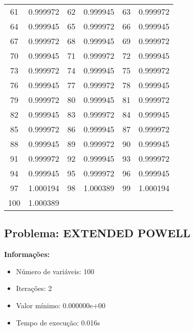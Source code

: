 \documentclass[12pt]{article}
\begin{document}
\begin{longtable}{@{}cc|cc|cc@{}}
61 & 0.999972 & 62 & 0.999945 & 63 & 0.999972 \\
64 & 0.999945 & 65 & 0.999972 & 66 & 0.999945 \\
67 & 0.999972 & 68 & 0.999945 & 69 & 0.999972 \\
70 & 0.999945 & 71 & 0.999972 & 72 & 0.999945 \\
73 & 0.999972 & 74 & 0.999945 & 75 & 0.999972 \\
76 & 0.999945 & 77 & 0.999972 & 78 & 0.999945 \\
79 & 0.999972 & 80 & 0.999945 & 81 & 0.999972 \\
82 & 0.999945 & 83 & 0.999972 & 84 & 0.999945 \\
85 & 0.999972 & 86 & 0.999945 & 87 & 0.999972 \\
88 & 0.999945 & 89 & 0.999972 & 90 & 0.999945 \\
91 & 0.999972 & 92 & 0.999945 & 93 & 0.999972 \\
94 & 0.999945 & 95 & 0.999972 & 96 & 0.999945 \\
97 & 1.000194 & 98 & 1.000389 & 99 & 1.000194 \\
100 & 1.000389 &  &  &  &  \\

\end{longtable}


\newpage            
\subsection{Problema: EXTENDED POWELL}

\textbf{Informações:}
\begin{itemize}
\item Número de variáveis: 100
\item Iterações: 2
\item Valor mínimo: 0.000000e+00
\item Tempo de execução: 0.016s
\end{itemize}
\end{document}
